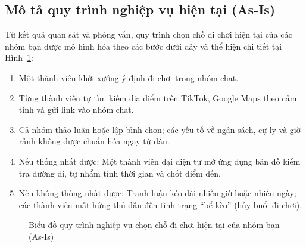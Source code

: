\documentclass[13pt,a4paper]{extreport}
\begin{document}
\subsection{Mô tả quy trình nghiệp vụ hiện tại (As-Is)}
Từ kết quả quan sát và phỏng vấn, quy trình chọn chỗ đi chơi hiện tại của các nhóm bạn được mô hình hóa theo các bước dưới đây và thể hiện chi tiết tại Hình~\ref{fig:asis}:
\begin{enumerate}
    \item Một thành viên khởi xướng ý định đi chơi trong nhóm chat.
    \item Từng thành viên tự tìm kiếm địa điểm trên TikTok, Google Maps theo cảm tính và gửi link vào nhóm chat.
    \item Cả nhóm thảo luận hoặc lập bình chọn; các yếu tố về ngân sách, cự ly và giờ rảnh không được chuẩn hóa ngay từ đầu.
    \item Nếu thống nhất được: Một thành viên đại diện tự mở ứng dụng bản đồ kiểm tra đường đi, tự nhẩm tính thời gian và chốt điểm đến.
    \item Nếu không thống nhất được: Tranh luận kéo dài nhiều giờ hoặc nhiều ngày; các thành viên mất hứng thú dẫn đến tình trạng ``bể kèo'' (hủy buổi đi chơi).
\end{enumerate}

\begin{figure}[H]
\centering
{}
\caption{Biểu đồ quy trình nghiệp vụ chọn chỗ đi chơi hiện tại của nhóm bạn (As-Is)}
\label{fig:asis}
\end{figure}
\end{document}
